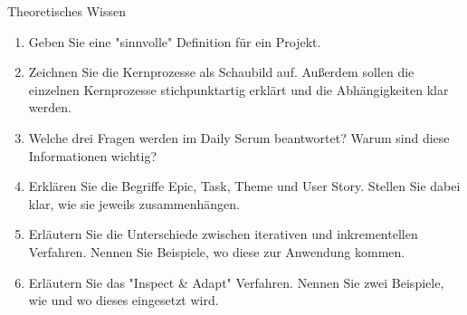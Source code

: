 \documentclass{article}
\begin{document}
\begin{exercise}{Theoretisches Wissen}
  \begin{enumerate}
    \item Geben Sie eine "sinnvolle" Definition für ein Projekt.
    \item Zeichnen Sie die Kernprozesse als Schaubild auf. Außerdem sollen die einzelnen Kernprozesse stichpunktartig erklärt und die Abhängigkeiten klar werden.
    \item Welche drei Fragen werden im Daily Scrum beantwortet? Warum sind diese Informationen wichtig?
    \item Erklären Sie die Begriffe Epic, Task, Theme und User Story. Stellen Sie dabei klar, wie sie jeweils zusammenhängen.
    \item Erläutern Sie die Unterschiede zwischen iterativen und inkrementellen Verfahren. Nennen Sie Beispiele, wo diese zur Anwendung kommen.
    \item Erläutern Sie das "Inspect \& Adapt" Verfahren. Nennen Sie zwei Beispiele, wie und wo dieses eingesetzt wird.
  \end{enumerate}


\end{exercise}
\end{document}
